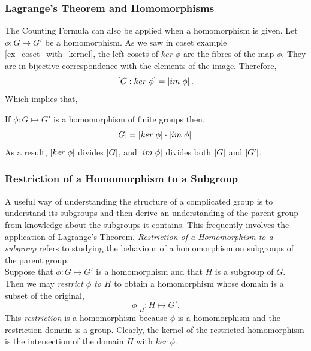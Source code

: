 \documentclass[MathsNotesBase.tex]{subfiles}
\begin{document}
{		\subsubsection{Lagrange's Theorem and Homomorphisms}
		The Counting Formula can also be applied when a homomorphism is given. Let $\phi : G \longmapsto G'$ be a homomorphism. As we saw in coset example \ref{ex_coset_with_kernel}, the left cosets of $ker \; \phi$ are the fibres of the map $\phi$. They are in bijective correspondence with the elements of the image. Therefore,
		\[ [G : ker \; \phi] = \left\lvert im \; \phi\right\rvert. \]
		Which implies that,
		\begin{corollary}
			\label{coro:order_of_image_divides_both_order_of_domain_and_codomain}
			If $\phi : G \longmapsto G'$ is a homomorphism of finite groups then,
			\[ \left\lvert G\right\rvert = \left\lvert ker \; \phi\right\rvert \cdot \left\lvert im \; \phi\right\rvert. \]
			As a result, $\left\lvert ker \; \phi\right\rvert$ divides $\left\lvert G\right\rvert$, and $\left\lvert im \; \phi\right\rvert$ divides both $\left\lvert G\right\rvert$ and $\left\lvert G'\right\rvert$.
		\end{corollary}
	
		\bigskip
		\subsubsection{Restriction of a Homomorphism to a Subgroup}
		A useful way of understanding the structure of a complicated group is to understand its subgroups and then derive an understanding of the parent group from knowledge about the subgroups it contains. This frequently involves the application of Lagrange's Theorem. \textit{Restriction of a Homomorphism to a subgroup} refers to studying the behaviour of a homomorphism on subgroups of the parent group.\\
		Suppose that ${ \phi: G \longmapsto G' }$ is a homomorphism and that $H$ is a subgroup of $G$. Then we may \textit{restrict $\phi$ to $H$} to obtain a homomorphism whose domain is a subset of the original,
		\[ \phi \vert_H : H \longmapsto G'. \]
		This \textit{restriction} is a homomorphism because $\phi$ is a homomorphism and the restriction domain is a group. Clearly, the kernel of the restricted homomorphism is the intersection of the domain $H$ with ${ ker\;\phi }$.
		
		\smallskip
}
\end{document}
